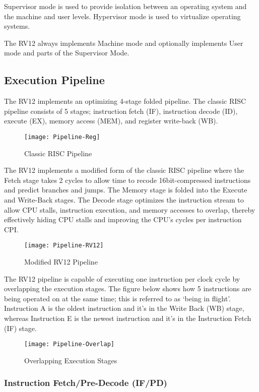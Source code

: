 Supervisor mode is used to provide isolation between an operating system
and the machine and user levels. Hypervisor mode is used to virtualize
operating systems.

The RV12 always implements Machine mode and optionally implements User mode and parts of the Supervisor Mode.

\subsection{Execution Pipeline}\label{execution-pipeline}

The RV12 implements an optimizing 4-stage folded pipeline. The classic RISC pipeline consists of 5 stages; instruction fetch (IF), instruction decode (ID), execute (EX), memory access (MEM), and register write-back (WB).

\begin{figure}[hbt]
  \texttt{[image: Pipeline-Reg]}
  \caption{Classic RISC Pipeline}
\end{figure}

The RV12 implements a modified form of the classic RISC pipeline where the
Fetch stage takes 2 cycles to allow time to recode 16bit-compressed
instructions and predict branches and jumps. The Memory stage is folded
into the Execute and Write-Back stages. The Decode stage optimizes the
instruction stream to allow CPU stalls, instruction execution, and
memory accesses to overlap, thereby effectively hiding CPU stalls and
improving the CPU's cycles per instruction CPI.

\begin{figure}[hbt]
  \texttt{[image: Pipeline-RV12]}
  \caption{Modified RV12 Pipeline}
\end{figure}

The RV12 pipeline is capable of executing one instruction per clock
cycle by overlapping the execution stages. The figure below shows how 5
instructions are being operated on at the same time; this is referred to
as `being in flight'. Instruction A is the oldest instruction and it's
in the Write Back (WB) stage, whereas Instruction E is the
newest instruction and it's in the Instruction Fetch (IF) stage.

\begin{figure}[hbt]
  \texttt{[image: Pipeline-Overlap]}
  \caption{Overlapping Execution Stages}
\end{figure}

\subsubsection{Instruction Fetch/Pre-Decode
(IF/PD)}\label{instruction-fetchpre-decode-ifpd}

